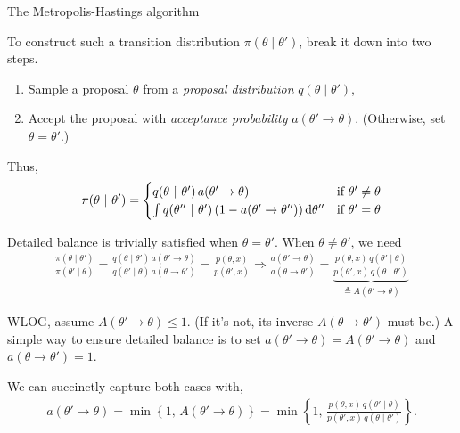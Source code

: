 \documentclass[aspectratio=169]{beamer}
\begin{document}
\begin{frame}[t,allowframebreaks]{The Metropolis-Hastings
algorithm}\label{the-metropolis-hastings-algorithm}

To construct such a transition distribution
\(\pi(\theta \mid \theta')\), break it down into two steps.

\begin{enumerate}
\item
  Sample a proposal \(\theta\) from a \emph{proposal distribution}
  \(q(\theta \mid \theta')\),
\item
  Accept the proposal with \emph{acceptance probability}
  \(a(\theta' \to \theta)\). (Otherwise, set \(\theta = \theta'\).)
\end{enumerate}

Thus, \begin{align*}
\pi(\theta ~\vert~ \theta') = 
\begin{cases}
q(\theta ~\vert~ \theta') \, a(\theta' \to \theta) & \text{if } \theta' \neq \theta \\
\int q(\theta'' ~\vert~ \theta') \, (1 - a(\theta' \to \theta'')) \mathop{}\!\mathrm{d} \theta'' & \text{if } \theta' = \theta
\end{cases}
\end{align*}

Detailed balance is trivially satisfied when \(\theta = \theta'\). When
\(\theta \neq \theta'\), we need \begin{align*}
\frac{\pi(\theta \mid \theta')}{\pi(\theta' \mid \theta)} = \frac{q(\theta \mid \theta') \, a(\theta' \to \theta)}{q(\theta' \mid \theta) \, a(\theta \to \theta')} = \frac{p(\theta, x)}{p(\theta', x)} \Rightarrow \frac{a(\theta' \to \theta)}{a(\theta \to \theta')} = \underbrace{\frac{p(\theta, x) \, q(\theta' \mid \theta)}{p(\theta', x) \, q(\theta \mid \theta')}}_{\triangleq A(\theta' \to \theta)}
\end{align*}

WLOG, assume $A(\theta' \to \theta) \leq 1$. (If it's not, its
inverse \(A(\theta \to \theta')\) must be.) A simple way to ensure
detailed balance is to set
\(a(\theta' \to \theta) = A(\theta' \to \theta)\) and
\(a(\theta \to \theta') = 1\).

We can succinctly capture both cases with, \begin{align*}
a(\theta' \to \theta) = \min \left\{1, \, A(\theta' \to \theta) \right \} = \min \left\{1, \, \frac{p(\theta, x) \, q(\theta' \mid \theta)}{p(\theta', x) \, q(\theta \mid \theta')} \right \}.
\end{align*}
\end{frame}
\end{document}
